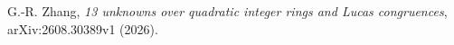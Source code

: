G.-R. Zhang,
\emph{13 unknowns over quadratic integer rings and Lucas congruences},
arXiv:2608.30389v1 (2026).
